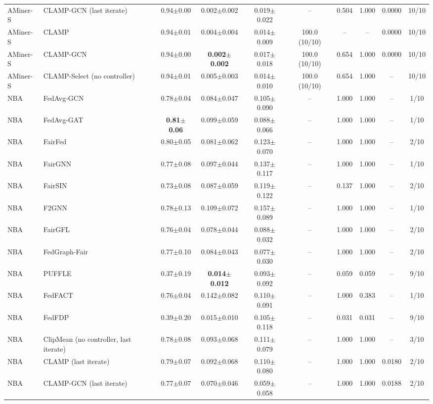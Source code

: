 \begin{table}[tbp]
{\begin{tabular}{llcccccccc}
AMiner-S & CLAMP-GCN (last iterate) & 0.94$\pm$0.00 & 0.002$\pm$0.002 & 0.019$\pm$0.022 & -- & 0.504 & 1.000 & 0.0000 & 10/10 \\
AMiner-S & CLAMP & 0.94$\pm$0.01 & 0.004$\pm$0.004 & 0.014$\pm$0.009 & 100.0 (10/10) & -- & -- & 0.0000 & 10/10 \\
AMiner-S & CLAMP-GCN & 0.94$\pm$0.00 & \textbf{0.002$\pm$0.002} & 0.017$\pm$0.018 & 100.0 (10/10) & 0.654 & 1.000 & 0.0000 & 10/10 \\
AMiner-S & CLAMP-Select (no controller) & 0.94$\pm$0.01 & 0.005$\pm$0.003 & 0.014$\pm$0.010 & 100.0 (10/10) & 0.654 & 1.000 & -- & 10/10 \\
NBA & FedAvg-GCN & 0.78$\pm$0.04 & 0.084$\pm$0.047 & 0.105$\pm$0.090 & -- & 1.000 & 1.000 & -- & 1/10 \\
NBA & FedAvg-GAT & \textbf{0.81$\pm$0.06} & 0.099$\pm$0.059 & 0.088$\pm$0.066 & -- & 1.000 & 1.000 & -- & 1/10 \\
NBA & FairFed & 0.80$\pm$0.05 & 0.081$\pm$0.062 & 0.123$\pm$0.070 & -- & 1.000 & 1.000 & -- & 2/10 \\
NBA & FairGNN & 0.77$\pm$0.08 & 0.097$\pm$0.044 & 0.137$\pm$0.117 & -- & 1.000 & 1.000 & -- & 1/10 \\
NBA & FairSIN & 0.73$\pm$0.08 & 0.087$\pm$0.059 & 0.119$\pm$0.122 & -- & 0.137 & 1.000 & -- & 2/10 \\
NBA & F2GNN & 0.78$\pm$0.13 & 0.109$\pm$0.072 & 0.157$\pm$0.089 & -- & 1.000 & 1.000 & -- & 1/10 \\
NBA & FairGFL & 0.76$\pm$0.04 & 0.078$\pm$0.044 & 0.088$\pm$0.032 & -- & 1.000 & 1.000 & -- & 2/10 \\
NBA & FedGraph-Fair & 0.77$\pm$0.10 & 0.084$\pm$0.043 & 0.077$\pm$0.030 & -- & 1.000 & 1.000 & -- & 2/10 \\
NBA & PUFFLE & 0.37$\pm$0.19 & \textbf{0.014$\pm$0.012} & 0.093$\pm$0.092 & -- & 0.059 & 0.059 & -- & 9/10 \\
NBA & FedFACT & 0.76$\pm$0.04 & 0.142$\pm$0.082 & 0.110$\pm$0.091 & -- & 1.000 & 0.383 & -- & 1/10 \\
NBA & FedFDP & 0.39$\pm$0.20 & 0.015$\pm$0.010 & 0.105$\pm$0.118 & -- & 0.031 & 0.031 & -- & 9/10 \\
NBA & ClipMean (no controller, last iterate) & 0.78$\pm$0.08 & 0.093$\pm$0.068 & 0.111$\pm$0.079 & -- & 1.000 & 1.000 & -- & 3/10 \\
NBA & CLAMP (last iterate) & 0.79$\pm$0.07 & 0.092$\pm$0.068 & 0.110$\pm$0.080 & -- & 1.000 & 1.000 & 0.0180 & 2/10 \\
NBA & CLAMP-GCN (last iterate) & 0.77$\pm$0.07 & 0.070$\pm$0.046 & 0.059$\pm$0.058 & -- & 1.000 & 1.000 & 0.0188 & 2/10 \\

\end{tabular}}
\end{table}
